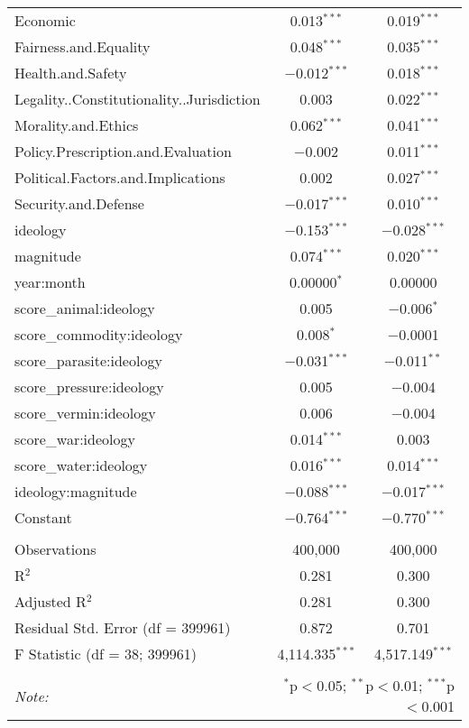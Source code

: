 \begin{table}[!htbp]
\begin{tabular}{@{\extracolsep{5pt}}lcc}
  Economic & 0.013$^{***}$ & 0.019$^{***}$ \\ 
  Fairness.and.Equality & 0.048$^{***}$ & 0.035$^{***}$ \\ 
  Health.and.Safety & $-$0.012$^{***}$ & 0.018$^{***}$ \\ 
  Legality..Constitutionality..Jurisdiction & 0.003 & 0.022$^{***}$ \\ 
  Morality.and.Ethics & 0.062$^{***}$ & 0.041$^{***}$ \\ 
  Policy.Prescription.and.Evaluation & $-$0.002 & 0.011$^{***}$ \\ 
  Political.Factors.and.Implications & 0.002 & 0.027$^{***}$ \\ 
  Security.and.Defense & $-$0.017$^{***}$ & 0.010$^{***}$ \\ 
  ideology & $-$0.153$^{***}$ & $-$0.028$^{***}$ \\ 
  magnitude & 0.074$^{***}$ & 0.020$^{***}$ \\ 
  year:month & 0.00000$^{*}$ & 0.00000 \\ 
  score\_animal:ideology & 0.005 & $-$0.006$^{*}$ \\ 
  score\_commodity:ideology & 0.008$^{*}$ & $-$0.0001 \\ 
  score\_parasite:ideology & $-$0.031$^{***}$ & $-$0.011$^{**}$ \\ 
  score\_pressure:ideology & 0.005 & $-$0.004 \\ 
  score\_vermin:ideology & 0.006 & $-$0.004 \\ 
  score\_war:ideology & 0.014$^{***}$ & 0.003 \\ 
  score\_water:ideology & 0.016$^{***}$ & 0.014$^{***}$ \\ 
  ideology:magnitude & $-$0.088$^{***}$ & $-$0.017$^{***}$ \\ 
  Constant & $-$0.764$^{***}$ & $-$0.770$^{***}$ \\ 
 \hline \\[-1.8ex] 
Observations & 400,000 & 400,000 \\ 
R$^{2}$ & 0.281 & 0.300 \\ 
Adjusted R$^{2}$ & 0.281 & 0.300 \\ 
Residual Std. Error (df = 399961) & 0.872 & 0.701 \\ 
F Statistic (df = 38; 399961) & 4,114.335$^{***}$ & 4,517.149$^{***}$ \\ 
\hline 
\hline \\[-1.8ex] 
\textit{Note:}  & \multicolumn{2}{r}{$^{*}$p$<$0.05; $^{**}$p$<$0.01; $^{***}$p$<$0.001} \\ 
\end{tabular} 
\end{table} 
